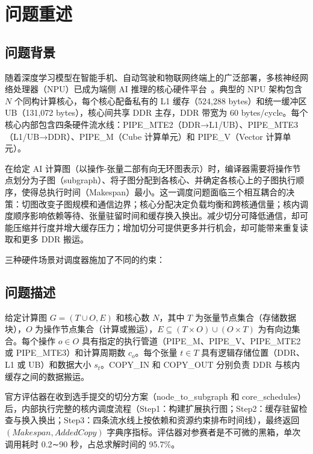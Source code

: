 \documentclass[bwprint]{gmcmthesis}
\begin{document}
\pagestyle{plain}


\section{问题重述}

\subsection{问题背景}

随着深度学习模型在智能手机、自动驾驶和物联网终端上的广泛部署，多核神经网络处理器（NPU）已成为端侧 AI 推理的核心硬件平台~\cite{jouppi2017}。典型的 NPU 架构包含 $N$ 个同构计算核心，每个核心配备私有的 L1 缓存（524,288 bytes）和统一缓冲区 UB（131,072 bytes），核心间共享 DDR 主存，DDR 带宽为 60 bytes/cycle。每个核心内部包含四条硬件流水线：PIPE\_MTE2（DDR→L1/UB）、PIPE\_MTE3（L1/UB→DDR）、PIPE\_M（Cube 计算单元）和 PIPE\_V（Vector 计算单元）。

在给定 AI 计算图（以操作-张量二部有向无环图表示）时，编译器需要将操作节点划分为子图（subgraph）、将子图分配到各核心、并确定各核心上的子图执行顺序，使得总执行时间（Makespan）最小。这一调度问题面临三个相互耦合的决策：切图改变子图规模和通信边界；核心分配决定负载均衡和跨核通信量；核内调度顺序影响依赖等待、张量驻留时间和缓存换入换出。减少切分可降低通信，却可能压缩并行度并增大缓存压力；增加切分可提供更多并行机会，却可能带来重复读取和更多 DDR 搬运。

三种硬件场景对调度器施加了不同的约束：

\subsection{问题描述}

给定计算图 $G = (T \cup O, E)$ 和核心数 $N$，其中 $T$ 为张量节点集合（存储数据块），$O$ 为操作节点集合（计算或搬运），$E \subseteq (T \times O) \cup (O \times T)$ 为有向边集合。每个操作 $o \in O$ 具有指定的执行管道（PIPE\_M、PIPE\_V、PIPE\_MTE2 或 PIPE\_MTE3）和计算周期数 $c_o$。每个张量 $t \in T$ 具有逻辑存储位置（DDR、L1 或 UB）和数据大小 $s_t$。COPY\_IN 和 COPY\_OUT 分别负责 DDR 与核内缓存之间的数据搬运。

官方评估器在收到选手提交的切分方案（node\_to\_subgraph 和 core\_schedules）后，内部执行完整的核内调度流程（Step1：构建扩展执行图；Step2：缓存驻留检查与换入换出；Step3：四条流水线上按依赖和资源约束排布时间线），最终返回 $(Makespan, AddedCopy)$ 字典序指标。评估器对参赛者是不可微的黑箱，单次调用耗时 0.2∼90 秒，占总求解时间的 95.7\%。
\end{document}
